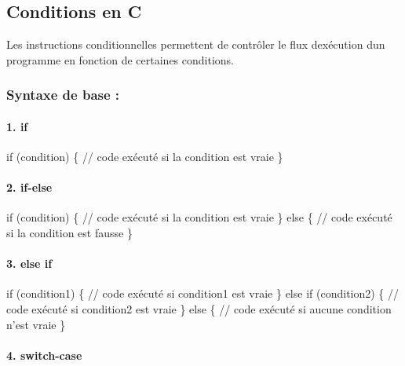 \subsection*{Conditions en C}

Les instructions conditionnelles permettent de contrôler le flux d\textquotesingle{}exécution d\textquotesingle{}un programme en fonction de certaines conditions.

\subsubsection*{Syntaxe de base \+:}

\paragraph*{1. {\ttfamily if}}


\begin{DoxyCode}
\textcolor{keywordflow}{if} (condition) \{
    \textcolor{comment}{// code exécuté si la condition est vraie}
\}
\end{DoxyCode}


\paragraph*{2. {\ttfamily if-\/else}}


\begin{DoxyCode}
\textcolor{keywordflow}{if} (condition) \{
    \textcolor{comment}{// code exécuté si la condition est vraie}
\} \textcolor{keywordflow}{else} \{
    \textcolor{comment}{// code exécuté si la condition est fausse}
\}
\end{DoxyCode}


\paragraph*{3. {\ttfamily else if}}


\begin{DoxyCode}
\textcolor{keywordflow}{if} (condition1) \{
    \textcolor{comment}{// code exécuté si condition1 est vraie}
\} \textcolor{keywordflow}{else} \textcolor{keywordflow}{if} (condition2) \{
    \textcolor{comment}{// code exécuté si condition2 est vraie}
\} \textcolor{keywordflow}{else} \{
    \textcolor{comment}{// code exécuté si aucune condition n'est vraie}
\}
\end{DoxyCode}


\paragraph*{4. {\ttfamily switch-\/case}}


